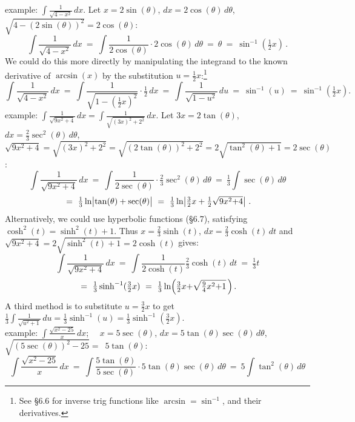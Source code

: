 \documentclass[11pt]{article}
\newcommand{\ts}{\textstyle}
\begin{document}
\noindent
{\sc example:} $\int\!\!\frac{1}{\sqrt{4-x^2}}\,dx$. Let $x=2\sin(\theta)$, $dx = 2\cos(\theta)\,d\theta$, $\sqrt{4{-}(2\sin(\theta))^2} = 2\cos(\theta)$:
$$
\int\!\!\frac{1}{\sqrt{4-x^2}}\,dx
\ =\
\int\!\!\frac{1}{2\cos(\theta)}\cdot 2\cos(\theta)\,d\theta
\ =\
\theta
\ =\ 
\sin^{-1}(\tfrac12x)\,.
$$
We could do this more directly by manipulating the integrand 
to the known derivative of $\arcsin(x)$ by the substitution $u=\frac12x$:\footnote{See \S6.6 for inverse trig functions like $\arcsin=\sin^{-1}$, and their derivatives.}
$$
\int\!\!\frac{1}{\sqrt{4{-}x^2}}\,dx
\ =\
\int\!\!\frac{1}{\sqrt{1{-}(\frac12 x)^2}}\cdot \tfrac12\,  dx
\ =\
\int\!\!\frac{1}{\sqrt{1{-}u^2}}\,du
\ =\
\sin^{-1}(u)
\ =\
\sin^{-1}(\tfrac12 x).
$$
%
{\sc example:} $\int\!\!\frac{1}{\sqrt{9x^2{+}4}}\,dx
=\int\!\!\frac{1}{\sqrt{(3x)^2{+}2^2}}\,dx$. 
Let $3x=2\tan(\theta)$, $dx = \frac23\sec^2(\theta)\,d\theta$, \\
$\sqrt{9x^2{+}4}=\sqrt{(3x)^2+2^2}=\sqrt{(2\tan(\theta))^2+2^2}=
2\sqrt{\tan^2(\theta)+1}= 2\sec(\theta)$:
$$
\int\!\!\frac{1}{\sqrt{9x^2{+}4}}\,dx
\ =\
\int\!\!\frac{1}{2\sec(\theta)}\cdot \tfrac23\sec^2(\theta)\,d\theta
\ =\
\tfrac13\!\int\!\sec(\theta)\,d\theta
$$
$$
\ =\ \tfrac13\ln\!\left|\vphantom{M^2}\!\tan(\theta) + \sec(\theta)\right|
\ =\ 
\tfrac13\ln\!\left|\tfrac32x +\tfrac12{\ts\sqrt{9x^2{+}4}}\right|\,.
$$
Alternatively, we could use hyperbolic functions (\S6.7),
satisfying $\cosh^2(t)=\sinh^2(t)+1$.
Thus $x = \frac23\sinh(t)$, $dx = \frac23 \cosh(t)\,dt$ and $\sqrt{9x^2+4} = 2\sqrt{\sinh^2(t) + 1} = 2 \cosh(t)$ gives:
$$
\int\! \frac{1}{\sqrt{9x^2+4}}\,dx 
\ =\  \int\! \frac{1}{2\cosh(t)}\tfrac23 \cosh(t)\,dt
\ =\  \tfrac13 t 
$$
$$
\ =\ \tfrac13\sinh^{-1}(\tfrac32 x)
\ =\ 
\tfrac13\ln\!\left(\tfrac32 x {+} \sqrt{ \smash{\tfrac94} x^2 {+} 1 }\,\right).
$$
A third method is to substitute $u=\frac32x$ 
to get $\frac13\int \frac1{\sqrt{u^2+1}}\,du=\frac13\sinh^{-1}(u)=\frac13\sinh^{-1}(\frac32 x)$.
\\[1.5em]
{\sc example:} $\int\!\!\frac{\sqrt{x^2{-}25}}x\,dx$; \ \ $x=5\sec(\theta)$, $dx = 5\tan(\theta)\sec(\theta)\,d\theta$, $\sqrt{\!(5\sec(\theta))^2{-}25}=$~$ 5\tan(\theta)$:
$$
\int\!\!\frac{\sqrt{x^2{-}25}}x\,dx
\ =\
\int\!\!\frac{5\tan(\theta)}{5\sec(\theta)}\cdot 5\tan(\theta)\sec(\theta)\,d\theta
\ =\
5\!\int\!\tan^2(\theta)\,d\theta
$$
\end{document}
